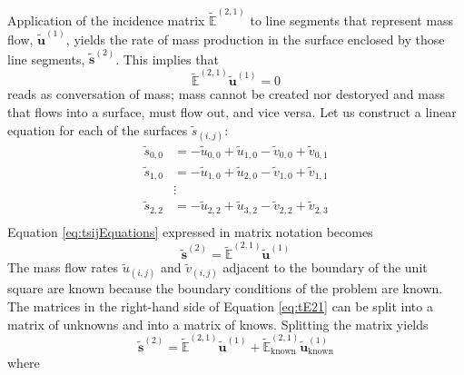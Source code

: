 Application of the incidence matrix $\tilde{\mathbb{E}}^{(2,1)}$ to line segments that represent mass flow, $\mathbf{\tilde{u}}^{(1)}$, yields the rate of mass production in the surface enclosed by those line segments, $\mathbf{\tilde{s}}^{(2)}$. This implies that
\begin{equation}
    \tilde{\mathbb{E}}^{(2,1)} \mathbf{\tilde{u}}^{(1)} = 0
\end{equation}
reads as conversation of mass; mass cannot be created nor destoryed and mass that flows into a surface, must flow out, and vice versa. Let us construct a linear equation for each of the surfaces $\tilde{s}_{(i,j)}$:
\begin{equation}
    \begin{split}
        \tilde{s}_{0,0} &= -\tilde{u}_{0,0} + \tilde{u}_{1,0} - \tilde{v}_{0,0} + \tilde{v}_{0,1} \\
        \tilde{s}_{1,0} &= -\tilde{u}_{1,0} + \tilde{u}_{2,0} - \tilde{v}_{1,0} + \tilde{v}_{1,1} \\
        &\vdots \\
        \tilde{s}_{2,2} &= -\tilde{u}_{2,2} + \tilde{u}_{3,2} - \tilde{v}_{2,2} + \tilde{v}_{2,3} \\
    \end{split}
    \label{eq:tsijEquations}
\end{equation}
Equation \eqref{eq:tsijEquations} expressed in matrix notation becomes
\begin{equation}
    \mathbf{\tilde{s}}^{(2)} = \tilde{\mathbb{E}}^{(2,1)} \mathbf{\tilde{u}}^{(1)}
    \label{eq:tE21}
\end{equation}
The mass flow rates $\tilde{u}_{(i,j)}$ and $\tilde{v}_{(i,j)}$ adjacent to the boundary of the unit square are known because the boundary conditions of the problem are known. The matrices in the right-hand side of Equation \eqref{eq:tE21} can be split into a matrix of unknowns and into a matrix of knows. Splitting the matrix yields
\begin{equation}
    \mathbf{\tilde{s}}^{(2)} = \tilde{\mathbb{E}}^{(2,1)} \mathbf{\tilde{u}}^{(1)} + \tilde{\mathbb{E}}^{(2,1)}_{\text{known}} \mathbf{\tilde{u}}^{(1)}_{\text{known}}
\end{equation}
where
